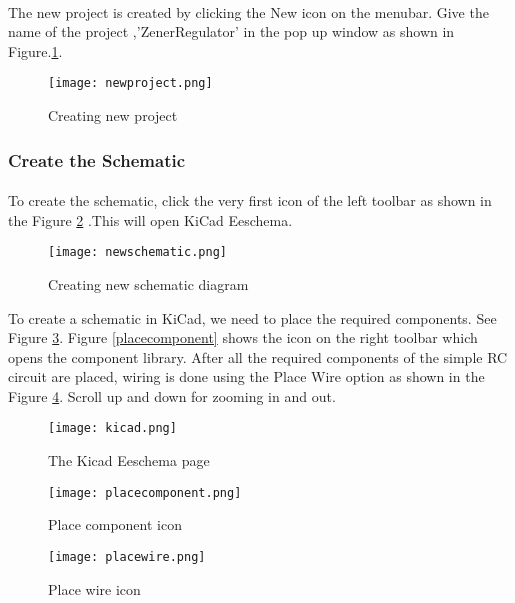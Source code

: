 \paragraph{ } The new project is created by clicking the New icon on the
menubar. Give the name of the project ,'ZenerRegulator' in the pop up window as shown in Figure.\ref{newproject}. 
\begin{figure}[H]
\centering
\texttt{[image: newproject.png]}
\caption{Creating new project}
\label{newproject}
\end{figure}

\subsubsection{Create the Schematic}

\paragraph{}  To create the schematic, click the very first icon of the
left toolbar as shown in the Figure \ref{newschematic} .This will open KiCad Eeschema.


\begin{figure}[H]
\centering
\texttt{[image: newschematic.png]}
\caption{Creating new schematic diagram}
\label{newschematic}
\end{figure}

To create a schematic in KiCad, we need to place the required components. See Figure \ref{kicad}.  Figure \ref{placecomponent}
shows the icon on the right toolbar which opens the component library. After all the required components of the simple RC circuit are placed, wiring is
done using the Place Wire option as shown in the Figure \ref{placewire}. Scroll up and down for zooming in and out.

\begin{figure}[H]
\centering
\texttt{[image: kicad.png]}
\caption{The Kicad Eeschema page}
\label{kicad}
\end{figure}




\begin{figure}[H]
\begin{minipage}{.5\textwidth}
  \centering
  \texttt{[image: placecomponent.png]}
  \caption{Place component icon}
  \label{placecomponent}
\end{minipage}%
\begin{minipage}{.5\textwidth}
  \centering
  \texttt{[image: placewire.png]}
  \caption{Place wire icon}
  \label{placewire}
\end{minipage}
\end{figure}


